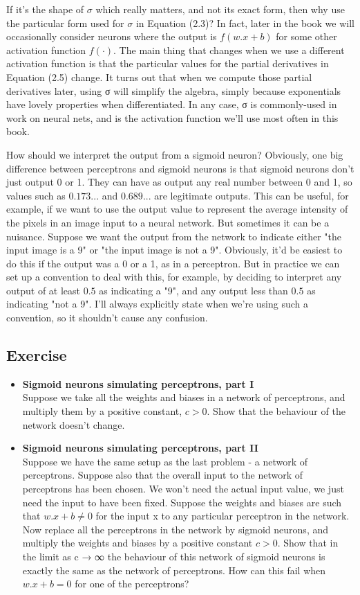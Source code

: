 \documentclass[a4paper,12pt]{report}%
\begin{document}
If it's the shape of $σ$ which really matters, and not its exact form, then why use the particular form used for $\sigma$ in Equation (2.3)? In fact, later in the book we will occasionally consider neurons where the output is $f(w. x+b)$ for some other activation function $f(\cdot)$. The main thing that changes when we use a different activation function is that the particular values for the partial derivatives in Equation (2.5) change. It turns out that when we compute those partial derivatives later, using σ will simplify the algebra, simply because exponentials have lovely properties when differentiated. In any case, σ is commonly-used in work on neural nets, and is the activation function we'll use most often in this book.

How should we interpret the output from a sigmoid neuron? Obviously, one big difference between perceptrons and sigmoid neurons is that sigmoid neurons don't just output 0 or 1. They can have as output any real number between 0 and 1, so values such as $0.173...$ and $0.689...$ are legitimate outputs. This can be useful, for example, if we want to use the output value to represent the average intensity of the pixels in an image input to a neural network. But sometimes it can be a nuisance. Suppose we want the output from the network to indicate either "the input image is a 9" or "the input image is not a 9". Obviously, it'd be easiest to do this if the output was a 0 or a 1, as in a perceptron. But in practice we can set up a convention to deal with this, for example, by deciding to interpret any output of at least $0.5$ as indicating a "9", and any output less than $0.5$ as indicating "not a 9". I'll always explicitly state when we're using such a convention, so it shouldn't cause any confusion.

\subsection{Exercise}
\begin{itemize}
\item {\bf Sigmoid neurons simulating perceptrons, part I} \\
    Suppose we take all the weights and biases in a network of perceptrons, and multiply them by a positive constant, $c > 0$. Show that the behaviour of the network doesn't change.

\item {\bf Sigmoid neurons simulating perceptrons, part II}\\
    Suppose we have the same setup as the last problem - a network of perceptrons. Suppose also that the overall input to the network of perceptrons has been chosen. We won't need the actual input value, we just need the input to have been fixed. Suppose the weights and biases are such that $w.x + b \ne 0$ for the input x to any particular perceptron in the network. Now replace all the perceptrons in the network by sigmoid neurons, and multiply the weights and biases by a positive constant $c > 0$. Show that in the limit as c → ∞ the behaviour of this network of sigmoid neurons is exactly the same as the network of perceptrons. How can this fail when $w.x + b = 0$  for one of the perceptrons?
\end{itemize}
\end{document}
